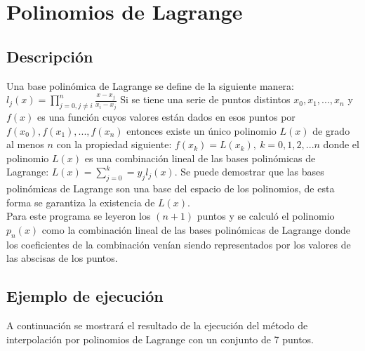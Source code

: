 \documentclass[12pt]{article}
\begin{document}
\section{Polinomios de Lagrange}
\subsection{Descripción}
Una base polinómica de Lagrange se define de la siguiente manera: $l_{j}(x) = \prod_{j=0, j \neq i}^{n}\frac{x - x_j}{x_i - x_j}$ Si se tiene una serie de puntos distintos $x_0,x_1,...,x_n$ y $f(x)$ es una función cuyos valores están dados en esos puntos por $f(x_0),f(x_1),...,f(x_n)$ entonces existe un único polinomio $L(x)$ de grado al menos $n$ con la propiedad siguiente: $f(x_k) = L(x_k),\ k=0,1,2,...n$ donde el polinomio $L(x)$ es una combinación lineal de las bases polinómicas de Lagrange: $L(x) = \sum_{j = 0}^{k} = y_jl_j(x)$. Se puede demostrar que las bases polinómicas de Lagrange son una base del espacio de los polinomios, de esta forma se garantiza la existencia de $L(x)$.\\

Para este programa se leyeron los $(n + 1)$ puntos y se calculó el polinomio $p_n(x)$ como la combinación lineal de las bases polinómicas de Lagrange donde los coeficientes de la combinación venían siendo representados por los valores de las abscisas de los puntos.

\subsection{Ejemplo de ejecución}
A continuación se mostrará el resultado de la ejecución del método de interpolación por polinomios de Lagrange con un conjunto de 7 puntos.\\
\end{document}
